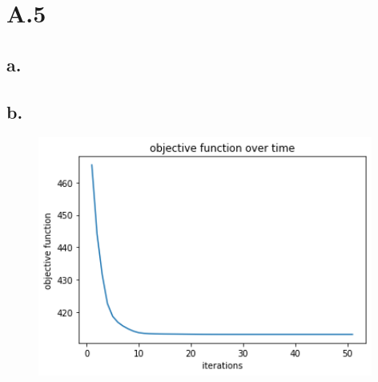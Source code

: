 \documentclass{article}
\newcommand{\field}[1]{\mathbb{#1}}
\newcommand{\1}{\mathbf{1}}
\newcommand{\R}{\field{R}} %
\newcommand{\norm}[1]{\left\|#1\right\|}
\begin{document}
\section*{A.5}
{\Large 


\subsection*{a.}


\subsection*{b.}


\begin{figure}[!hb]
  \centering
  \includegraphics[width=110mm]{../hw4-code/results/a5_b.png}
\end{figure}

}
\end{document}
